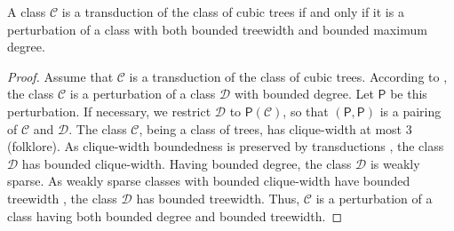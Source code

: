 \documentclass{lmcs}
\newcommand{\Cc}{\mathscr{C}}
\newcommand{\Dd}{\mathscr{D}}
\theoremstyle{definition}
\begin{document}
\begin{prop}
	\label{lem:BT}
	A class $\Cc$ is a transduction of  the class of cubic trees if and only if it is 
	 a perturbation of  a class with both bounded treewidth and bounded maximum degree.
\end{prop}
\begin{proof}
	Assume that $\Cc$  is a transduction of  the class of cubic trees.
According to , the class $\Cc$ is a 
perturbation of a class $\Dd$ with bounded degree. 
Let $\mathsf P$ be this perturbation. 
If necessary, we restrict $\Dd$ to $\mathsf P(\Cc)$, so that 
$(\mathsf P,\mathsf P)$ is a pairing of $\Cc$ and $\Dd$.
The class $\Cc$, being a class of trees, has clique-width at most $3$ (folklore).  As clique-width boundedness is preserved by transductions \cite{colcombet2007combinatorial}, the class $\Dd$ has bounded clique-width. Having bounded degree, the class $\Dd$ is weakly sparse. As weakly sparse classes with bounded clique-width have bounded treewidth \cite{Gurski2000}, the class $\Dd$ has bounded treewidth.
Thus, $\Cc$ is a perturbation of a class having both bounded degree and bounded treewidth.
	

\end{proof}
\end{document}
